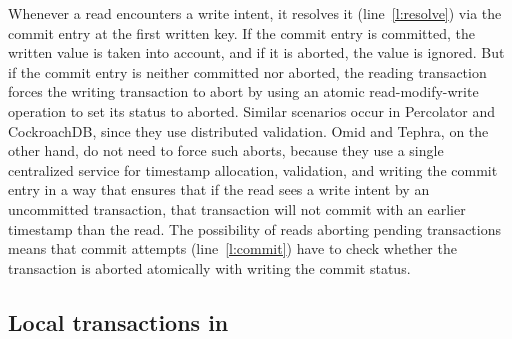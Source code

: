 Whenever a read encounters a write intent, it resolves it (line~\ref{l:resolve}) via the commit entry at the first written key. 
If the commit entry is committed, the written value is taken into account, and if it is aborted, the value is ignored. 
But if the commit entry is neither committed nor aborted, the reading transaction forces the writing transaction to abort by using 
an atomic read-modify-write operation to set its status to aborted. Similar scenarios occur in Percolator and CockroachDB, since 
they use distributed validation. Omid and Tephra, on the other hand, do not need to force such aborts, because they use a single centralized service for timestamp allocation, validation, and writing the commit entry in a way that ensures that  if the read sees a write intent by an uncommitted transaction, that transaction will not commit with an earlier timestamp than the read.
%
The possibility of reads aborting pending transactions means that commit attempts (line~\ref{l:commit}) have to  
check whether the transaction is aborted atomically with writing the commit status.


\subsection{Local transactions in \sys}
\label{ssec:fp-impl}





